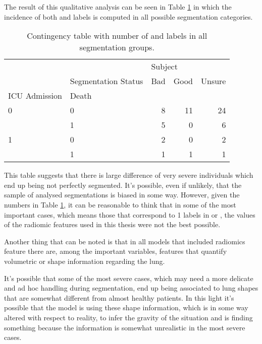 The result of this qualitative analysis can be seen in Table \ref{tab:ContingencyTableSegm} in which the incidence of both \death and \icu labels is computed in all possible segmentation categories.

\begin{table}
\centering
\caption{Contingency table with number of \death and \icu labels in all segmentation groups. \label{tab:ContingencyTableSegm}}
\begin{tabular}{llrrr}
\toprule
  & {} & \multicolumn{3}{l}{Subject} \\
  & Segmentation Status &     Bad & Good & Unsure \\
ICU Admission & Death &         &      &        \\
\midrule
0 & 0 &       8 &   11 &     24 \\
  & 1 &       5 &    0 &      6 \\
1 & 0 &       2 &    0 &      2 \\
  & 1 &       1 &    1 &      1 \\
\bottomrule
\end{tabular}
\end{table}

This table suggests that there is large difference of very severe individuals which end up being not perfectly segmented.
It's possible, even if unlikely, that the sample of analysed segmentations is biased in some way. However, given the numbers in Table \ref{tab:ContingencyTableSegm}, it can be reasonable to think that in some of the most important cases, which means those that correspond to 1 labels in \death or \icu, the values of the radiomic features used in this thesis were not the best possible. 

Another thing that can be noted is that in all models that included radiomics feature there are, among the important variables, features that quantify volumetric or shape information regarding the lung.

It's possible that some of the most severe cases, which may need a more delicate and ad hoc handling during segmentation, end up being associated to lung shapes that are somewhat different from almost healthy patients.
In this light it's possible that the model is using these shape information, which is in some way altered with respect to reality, to infer the gravity of the situation and is finding something  because the information is somewhat unrealistic in the most severe cases.